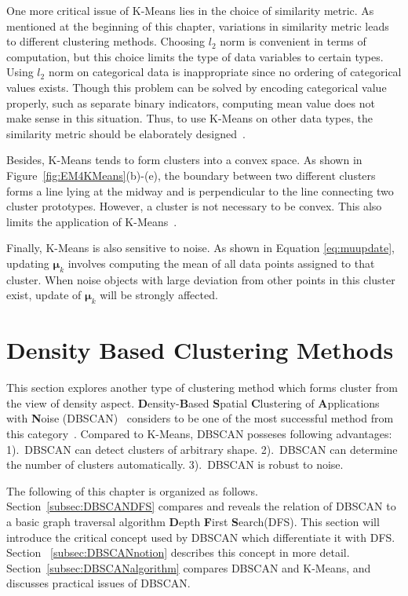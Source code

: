 One more critical issue of K-Means lies in the choice of similarity metric. As mentioned at the beginning of this chapter, variations in similarity metric leads to different clustering methods. Choosing \(l_2\) norm is convenient in terms of computation, but this choice limits the type of data variables to certain types. Using \(l_2\) norm on categorical data is inappropriate since no ordering of categorical values exists. Though this problem can be solved by encoding categorical value properly, such as separate binary indicators, computing mean value does not make sense in this situation. Thus, to use K-Means on other data types, the similarity metric should be elaborately designed~\cite{PRML}. 

Besides, K-Means tends to form clusters into a convex space. As shown in Figure~\ref{fig:EM4KMeans}(b)-(e), the boundary between two different clusters forms a line lying at the midway and is perpendicular to the line connecting two cluster prototypes. However, a cluster is not necessary to be convex. This also limits the application of K-Means~\cite{sklearn:DBSCAN}.

Finally, K-Means is also sensitive to noise. As shown in Equation \ref{eq:muupdate}, updating \(\boldsymbol{\mu}_k\) involves computing the mean of all data points assigned to that cluster. When noise objects with large deviation from other points in this cluster exist, update of \(\boldsymbol{\mu}_k\) will be strongly affected.

\section{Density Based Clustering Methods}
This section explores another type of clustering method which forms cluster from the view of density aspect. \textbf{D}ensity-\textbf{B}ased \textbf{S}patial \textbf{C}lustering of \textbf{A}pplications with \textbf{N}oise (DBSCAN)~\cite{ester1996density} considers to be one of the most successful method from this category~\cite{2014timeaward}. Compared to K-Means, DBSCAN posseses following advantages: 1).\ DBSCAN can detect clusters of arbitrary shape. 2).\ DBSCAN can determine the number of clusters automatically. 3).\ DBSCAN is robust to noise. 

The following of this chapter is organized as follows. Section~\ref{subsec:DBSCANDFS} compares and reveals the relation of DBSCAN to a basic graph traversal algorithm \textbf{D}epth \textbf{F}irst \textbf{S}earch(DFS). This section will introduce the critical concept used by DBSCAN which differentiate it with DFS. Section ~\ref{subsec:DBSCANnotion} describes this concept in more detail. Section~\ref{subsec:DBSCANalgorithm} compares DBSCAN and K-Means, and discusses practical issues of DBSCAN.

